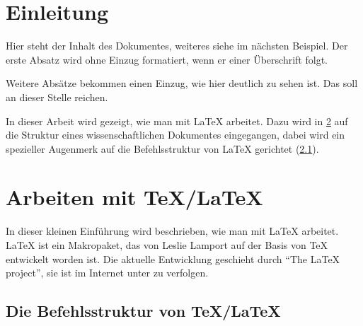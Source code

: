 \documentclass[ngerman,               %
               a4paper,               %
               fleqn,                 %
                     ]{scrartcl}       %
\begin{document}
\mainmatter                     %

\chapter{Einleitung}   %

Hier steht der Inhalt des Dokumentes, weiteres siehe im n\"achsten
Beispiel. Der erste Absatz wird ohne Einzug formatiert, wenn er
einer \"Uberschrift folgt.

Weitere Absätze bekommen einen Einzug, wie hier deutlich zu sehen ist.
Das soll an dieser Stelle reichen.

In dieser Arbeit wird gezeigt, wie man mit \LaTeX{} arbeitet. Dazu
wird in \cref{chap:TeX} auf die Struktur eines wissenschaftlichen
Dokumentes eingegangen, dabei wird ein spezieller Augenmerk auf die
Befehlsstruktur von \LaTeX{} gerichtet (\cref{sec:befehlsstruktur}).


\chapter{Arbeiten mit \TeX/\LaTeX}%
\label{chap:TeX}                  %

In dieser kleinen Einführung wird beschrieben, wie man mit \LaTeX{} arbeitet.
\LaTeX{} ist ein Makropaket, das von Leslie Lamport auf der Basis
von \TeX{} \cite{knuth_86:tex_book} entwickelt worden ist. Die aktuelle
Entwicklung geschieht durch "`The \LaTeX{} project"', sie ist im Internet
unter zu verfolgen.

\section[Die Befehlsstruktur]{Die Befehlsstruktur von \TeX/\LaTeX}%
\label{sec:befehlsstruktur}

\end{document}
